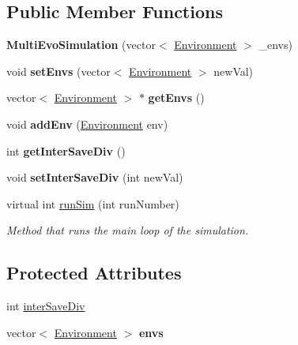 \subsection*{Public Member Functions}
\begin{DoxyCompactItemize}
\item 
\hypertarget{classMultiEvoSimulation_a39ba876ac0a8771dca1773b37de567dd}{}\label{classMultiEvoSimulation_a39ba876ac0a8771dca1773b37de567dd} 
{\bfseries Multi\+Evo\+Simulation} (vector$<$ \hyperlink{classEnvironment}{Environment} $>$ \+\_\+envs)
\item 
\hypertarget{classMultiEvoSimulation_a965cbb6a21b59b1dcb69a8f7a5cdc63f}{}\label{classMultiEvoSimulation_a965cbb6a21b59b1dcb69a8f7a5cdc63f} 
void {\bfseries set\+Envs} (vector$<$ \hyperlink{classEnvironment}{Environment} $>$ new\+Val)
\item 
\hypertarget{classMultiEvoSimulation_ad15f986cabbba30190e44c503bb02dbd}{}\label{classMultiEvoSimulation_ad15f986cabbba30190e44c503bb02dbd} 
vector$<$ \hyperlink{classEnvironment}{Environment} $>$ $\ast$ {\bfseries get\+Envs} ()
\item 
\hypertarget{classMultiEvoSimulation_af1ed90eb8f214164e5944fa599bebc0f}{}\label{classMultiEvoSimulation_af1ed90eb8f214164e5944fa599bebc0f} 
void {\bfseries add\+Env} (\hyperlink{classEnvironment}{Environment} env)
\item 
\hypertarget{classMultiEvoSimulation_a38cb7774707b70d9d2b08f25132a2ca2}{}\label{classMultiEvoSimulation_a38cb7774707b70d9d2b08f25132a2ca2} 
int {\bfseries get\+Inter\+Save\+Div} ()
\item 
\hypertarget{classMultiEvoSimulation_a325406773501841bbfb51b737ef4fdaf}{}\label{classMultiEvoSimulation_a325406773501841bbfb51b737ef4fdaf} 
void {\bfseries set\+Inter\+Save\+Div} (int new\+Val)
\item 
virtual int \hyperlink{classMultiEvoSimulation_a89c9806ac998c06230cdd41cc6a532bf}{run\+Sim} (int run\+Number)
\begin{DoxyCompactList}\small\item\em Method that runs the main loop of the simulation. \end{DoxyCompactList}\end{DoxyCompactItemize}
\subsection*{Protected Attributes}
\begin{DoxyCompactItemize}
\item 
int \hyperlink{classMultiEvoSimulation_ac9389b3f03afb6195da67337cd1f1957}{inter\+Save\+Div}
\item 
\hypertarget{classMultiEvoSimulation_a17a397017c8b5ea23810bd2f06fac253}{}\label{classMultiEvoSimulation_a17a397017c8b5ea23810bd2f06fac253} 
vector$<$ \hyperlink{classEnvironment}{Environment} $>$ {\bfseries envs}
\end{DoxyCompactItemize}


